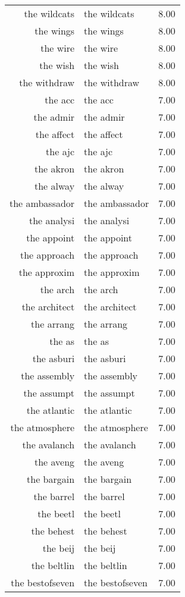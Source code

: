 \begin{table}[ht]
\begin{tabular}{rlr}
  the wildcats & the wildcats & 8.00 \\ 
  the wings & the wings & 8.00 \\ 
  the wire & the wire & 8.00 \\ 
  the wish & the wish & 8.00 \\ 
  the withdraw & the withdraw & 8.00 \\ 
  the acc & the acc & 7.00 \\ 
  the admir & the admir & 7.00 \\ 
  the affect & the affect & 7.00 \\ 
  the ajc & the ajc & 7.00 \\ 
  the akron & the akron & 7.00 \\ 
  the alway & the alway & 7.00 \\ 
  the ambassador & the ambassador & 7.00 \\ 
  the analysi & the analysi & 7.00 \\ 
  the appoint & the appoint & 7.00 \\ 
  the approach & the approach & 7.00 \\ 
  the approxim & the approxim & 7.00 \\ 
  the arch & the arch & 7.00 \\ 
  the architect & the architect & 7.00 \\ 
  the arrang & the arrang & 7.00 \\ 
  the as & the as & 7.00 \\ 
  the asburi & the asburi & 7.00 \\ 
  the assembly & the assembly & 7.00 \\ 
  the assumpt & the assumpt & 7.00 \\ 
  the atlantic & the atlantic & 7.00 \\ 
  the atmosphere & the atmosphere & 7.00 \\ 
  the avalanch & the avalanch & 7.00 \\ 
  the aveng & the aveng & 7.00 \\ 
  the bargain & the bargain & 7.00 \\ 
  the barrel & the barrel & 7.00 \\ 
  the beetl & the beetl & 7.00 \\ 
  the behest & the behest & 7.00 \\ 
  the beij & the beij & 7.00 \\ 
  the beltlin & the beltlin & 7.00 \\ 
  the bestofseven & the bestofseven & 7.00 \\ 

\end{tabular}
\end{table}
